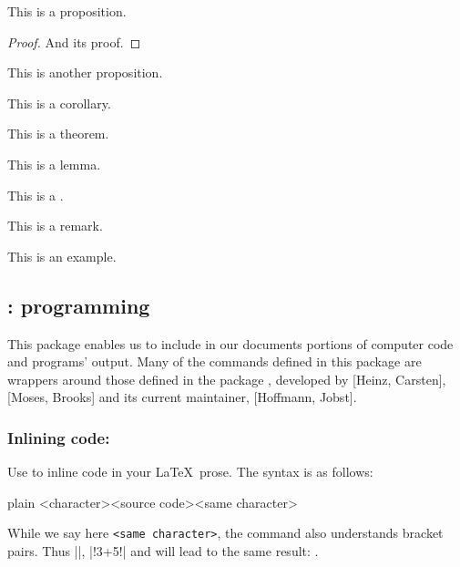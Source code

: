 \begin{proposition}
This is a proposition.
\begin{proof}
And its proof.
\end{proof}
\end{proposition}

\begin{proposition}
This is another proposition.
\end{proposition}

\begin{corollary}
This is a corollary.
\end{corollary}

\begin{theorem}
This is a theorem.
\end{theorem}

\begin{lemma}
This is a lemma.
\end{lemma}

\begin{definition}
This is a .
\end{definition}

\begin{remark}
This is a remark.
\end{remark}

\begin{example}
This is an example.
\end{example}

\subsection{: programming}

This package enables us to include in our documents portions of computer code and programs' output. Many of the commands defined in this package are wrappers around those defined in the package , developed by [Heinz, Carsten], [Moses, Brooks] and its current maintainer, [Hoffmann, Jobst].

\subsubsection{Inlining code: \code{\\code}}

Use \code{\code} to inline code in your \LaTeX~prose. The syntax is as follows:
\begin{snippet}{plain}
\code[<key=value list>]<character><source code><same character>
\end{snippet}
While we say here \verb"<same character>", the command also understands bracket pairs. Thus \code||, \code|\code!3+5!| and  will lead to the same result: .

